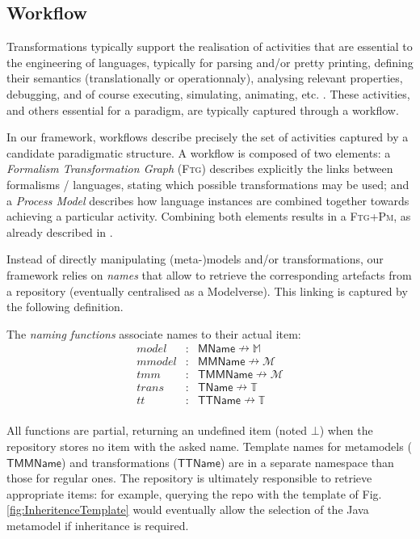 \subsection{Workflow}
\label{sec:Workflow}


Transformations typically support the realisation of activities that are 
essential to the engineering of languages, typically for parsing and/or pretty 
printing, defining their semantics (translationally or operationnaly), 
analysing relevant properties, debugging, and of course executing, simulating, 
animating, etc. \cite{J:Lucio-Amrani-etAl:2014}. These activities, and others 
essential for a paradigm, are typically captured through a workflow.

In our framework, workflows describe precisely the set of activities captured 
by a candidate paradigmatic structure. A workflow is composed of two elements: 
a \emph{Formalism Transformation Graph} (\textsc{Ftg}) describes explicitly the 
links between formalisms / languages, stating which possible transformations 
may be used; and a \emph{Process Model} describes how language instances are 
combined together towards achieving a particular activity. Combining both 
elements results in a \textsc{Ftg+Pm}, as already described in 
\cite{Mustafiz-etAl:2012,Lucio-Mustafiz-etAl:2013,TR:Lucio-Mustafiz-etAl:2012}.

Instead of directly manipulating (meta-)models and/or transformations, our 
framework relies on \emph{names} that allow to retrieve the corresponding 
artefacts from a repository (eventually centralised as a Modelverse). This 
linking is captured by the following definition.

\begin{Definition}
   The \emph{naming functions} associate names to their actual item:
   \begin{displaymath}
      \begin{array}{rcl}
         model  &\colon& \mathsf{MName} \nrightarrow \mathbb{M}\\
         mmodel &\colon& \mathsf{MMName} \nrightarrow \mathcal{M}\\
         tmm    &\colon& \mathsf{TMMName} \nrightarrow \mathcal{M}\\
         trans  &\colon& \mathsf{TName} \nrightarrow \mathbb{T}\\
         tt     &\colon& \mathsf{TTName} \nrightarrow \mathbb{T}\\
      \end{array}
   \end{displaymath}
\end{Definition}
\noindent
All functions are partial, returning an undefined item (noted $\bot$) when the 
repository stores no item with the asked name. Template names for metamodels 
($\mathsf{TMMName}$) and transformations ($\mathsf{TTName}$) are in a separate 
namespace than those for regular ones. The repository is ultimately responsible 
to retrieve appropriate items: for example, querying the repo with the template 
of Fig. \ref{fig:InheritenceTemplate} would eventually allow the selection of 
the Java metamodel if inheritance is required.

